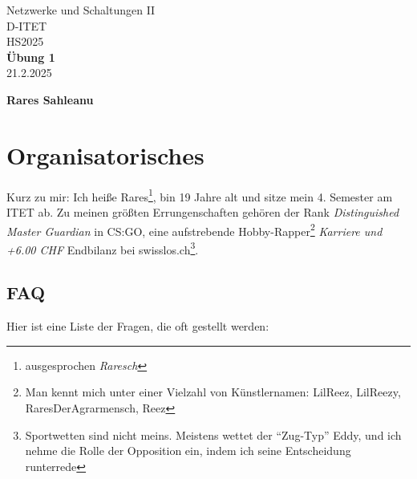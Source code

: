 \documentclass[11pt,a4paper]{article}
\title{}
\date{}  %
\begin{document}
\begin{titlepage}
    \centering
    
    {\Huge Netzwerke und Schaltungen II}\\[0.8cm]
    {\Large D-ITET}\\[0.8cm]
    {\Large HS2025}\\[3.5cm]
    
    {\Huge \textbf{Übung 1}}\\[1cm]
    {\Large 21.2.2025}\\[3.5cm]


    \vfill
    {\Large \textbf{Rares Sahleanu}}
\end{titlepage}


\newpage
\pagestyle{fancy}  


\fancyfoot[L]{}  
\fancyfoot[C]{\thepage}
\fancyfoot[R]{}

\renewcommand{\headrulewidth}{0.4pt}  
\renewcommand{\footrulewidth}{0pt}  

\section{Organisatorisches}
Kurz zu mir: Ich heiße Rares\footnote{ausgesprochen \textit{Raresch} \textipa{['ra:r\esh]}}, bin 19 Jahre alt und sitze mein 4. Semester am ITET ab. Zu meinen größten Errungenschaften gehören der Rank \textit{Distinguished Master Guardian} in CS:GO, eine aufstrebende Hobby-Rapper\footnote{Man kennt mich unter einer Vielzahl von Künstlernamen: LilReez, LilReezy, RaresDerAgrarmensch, Reez} \textit{Karriere und +6.00 CHF} Endbilanz bei swisslos.ch\footnote{Sportwetten sind nicht meins. Meistens wettet der ``Zug-Typ'' Eddy, und ich nehme die Rolle der Opposition ein, indem ich seine Entscheidung runterrede}. 

\subsection{FAQ}
Hier ist eine Liste der Fragen, die oft gestellt werden:
\end{document}
